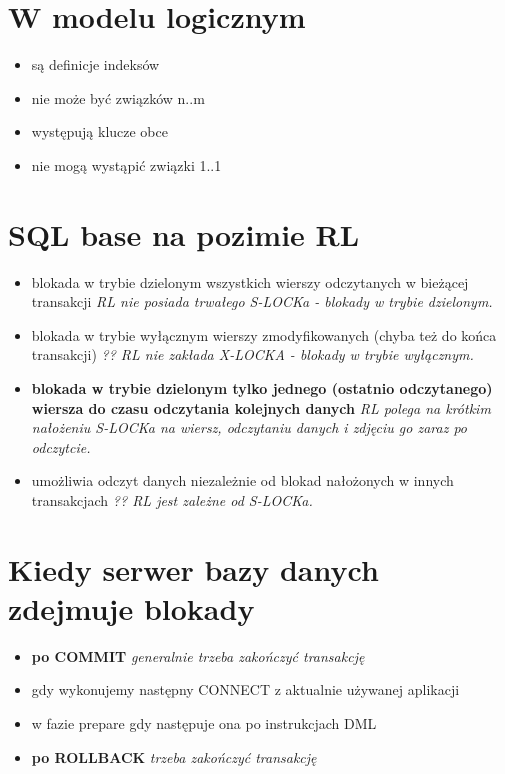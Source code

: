 \documentclass[a4paper,twoside]{article}
\begin{document}
  	\section{W modelu logicznym}
  	\begin{itemize}
  		\item są definicje indeksów
  		\item nie może być związków n..m
  		\item występują klucze obce
  		\item nie mogą wystąpić związki 1..1
  	\end{itemize}
  	
  	\section{SQL base na pozimie RL}
  	\begin{itemize}
  		\item blokada w trybie dzielonym wszystkich wierszy odczytanych w bieżącej transakcji \emph{RL nie posiada trwałego S-LOCKa - blokady w trybie dzielonym.}
  		\item blokada w trybie wyłącznym wierszy zmodyfikowanych (chyba też do końca transakcji) \emph{?? RL nie zakłada X-LOCKA - blokady w trybie wyłącznym.}
  		\item \textbf{blokada w trybie dzielonym tylko jednego (ostatnio odczytanego) wiersza do czasu odczytania kolejnych danych} \emph{RL polega na krótkim nałożeniu S-LOCKa na wiersz, odczytaniu danych i zdjęciu go zaraz po odczytcie.}
  		\item umożliwia odczyt danych niezależnie od blokad nałożonych w innych transakcjach \emph{?? RL jest zależne od S-LOCKa.}
  	\end{itemize}
  	
  	\section{Kiedy serwer bazy danych zdejmuje blokady}
  	\begin{itemize}
  		\item \textbf{po COMMIT} \emph{generalnie trzeba zakończyć transakcję}
  		\item gdy wykonujemy następny CONNECT z aktualnie używanej aplikacji
  		\item w fazie prepare gdy następuje ona po instrukcjach DML
  		\item \textbf{po ROLLBACK} \emph{trzeba zakończyć transakcję}
  	\end{itemize}
  	
\end{document}
